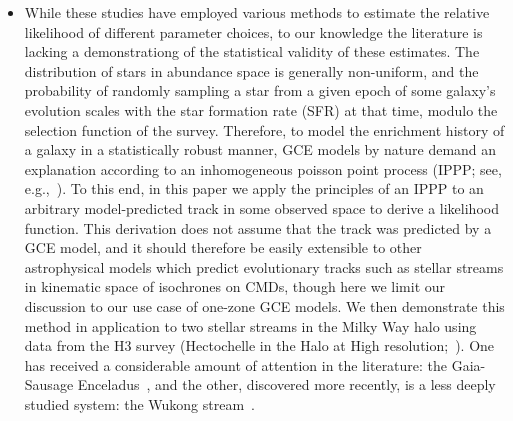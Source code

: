 \documentclass[ms.tex]{subfiles}
\begin{document}
\begin{itemize}
	\item While these studies have employed various methods to estimate the
	relative likelihood of different parameter choices, to our knowledge the
	literature is lacking a demonstrationg of the statistical validity of these
	estimates.
	The distribution of stars in abundance space is generally non-uniform, and
	the probability of randomly sampling a star from a given epoch of some
	galaxy's evolution scales with the star formation rate (SFR) at that time,
	modulo the selection function of the survey.
	Therefore, to model the enrichment history of a galaxy in a statistically
	robust manner, GCE models by nature demand an explanation according to an
	inhomogeneous poisson point process (IPPP; see, e.g.,~\citealp{Press2007}).
	To this end, in this paper we apply the principles of an IPPP to an
	arbitrary model-predicted track in some observed space to derive a
	likelihood function.
	This derivation does not assume that the track was predicted by a GCE model,
	and it should therefore be easily extensible to other astrophysical models
	which predict evolutionary tracks such as stellar streams in kinematic
	space of isochrones on CMDs, though here we limit our discussion to our use
	case of one-zone GCE models.
	We then demonstrate this method in application to two stellar streams in
	the Milky Way halo using data from the H3 survey (Hectochelle in the Halo
	at High resolution;~\citealp{Conroy2019}).
	One has received a considerable amount of attention in the literature: the
	Gaia-Sausage Enceladus~\citep[GSE;][]{Belokurov2018, Helmi2018}, and
	the other, discovered more recently, is a less deeply studied system: the
	Wukong stream~\citep{Naidu2020, Naidu2022}.



\end{itemize}
\end{document}
